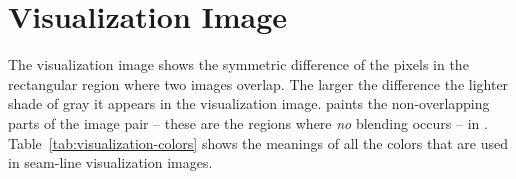 

\chapter[Visualization Image]{\label{sec:visualization-image}%
  Visualization Image}

The visualization image shows the symmetric difference of the pixels in the rectangular region
where two images overlap.  The larger the difference the lighter shade of gray it appears in the
visualization image.  \App{} paints the non-overlapping parts of the image pair -- these are the
regions where \emph{no} blending occurs -- in .
Table~\ref{tab:visualization-colors} shows the meanings of all the colors that are used in
seam-line visualization images.

